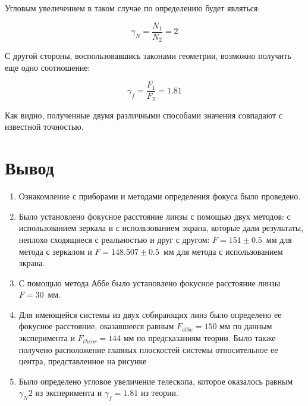 \documentclass[a4paper, 12pt]{article}
\begin{document}
Угловым увеличением в таком случае по определению будет являться:

\begin{equation}
	\boxed{
	\gamma_N = \frac{N_1}{N_2} = 2}
\end{equation}

С другой стороны, воспользовавшись законами геометрии, возможно получить еще одно соотношение:

\begin{equation*}
	\gamma_f = \frac{F_1}{F_2} = 1.81
\end{equation*}

Как видно, полученные двумя различными способами значения совпадают с известной точностью.

\section{Вывод}

\begin{enumerate}
	\item Ознакомление с приборами и методами определения фокуса было проведено.
	
	\item Было установлено фокусное расстояние линзы с помощью двух методов: с использованием зеркала и с использованием экрана, которые дали результаты, неплохо сходящиеся с реальностью и друг с другом: $F = 151\pm 0.5$~мм для метода с зеркалом и $F = 148.507 \pm 0.5$~мм для метода с использованием экрана. %
	
	\item С помощью метода Аббе было установлено фокусное расстояние линзы $F = 30$~мм. %
	
	\item  Для имеющейся системы из двух собирающих линз было определено ее фокусное расстояние, оказавшееся равным $F_{abbe} = 150 \text{ мм}$ по данным эксперимента и $F_{theor} = 144 \text{ мм}$ по предсказаниям теории. Было также получено расположение главных плоскостей системы относительное ее центра, представленное на рисунке %
	
	\item Было определено угловое увеличение телескопа, которое оказалось равным $\gamma_N 2$ из эксперимента и $\gamma_f = 1.81$ из теории. 
\end{enumerate}
\end{document}
